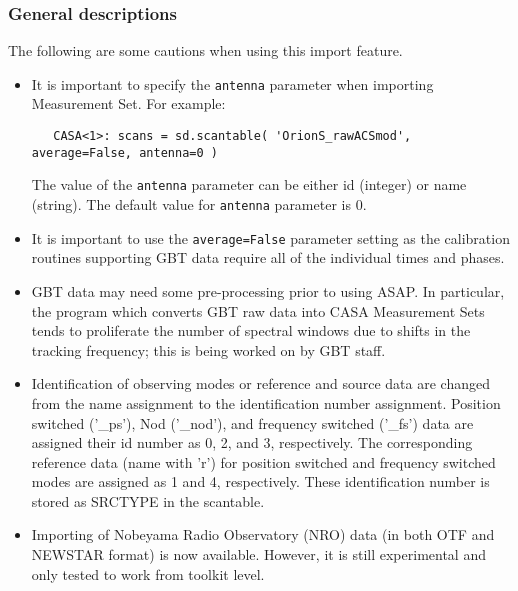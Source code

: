 \subsubsection{General descriptions}
\label{subsubsection:sd.asap.import.gen}

The following are some cautions when using this import feature.

\begin{itemize}

\item It is important to specify the {\tt antenna} parameter when importing Measurement Set.
 For example:

\begin{verbatim}
   CASA<1>: scans = sd.scantable( 'OrionS_rawACSmod', average=False, antenna=0 )
\end{verbatim}
 
 The value of the {\tt antenna} parameter can be either id (integer) or name
 (string). The default value for {\tt antenna} parameter is 0.

\item It is important to use the {\tt average=False} parameter
setting as the calibration routines supporting GBT data require all of
the individual times and phases.

\item GBT data may need some pre-processing prior to using
ASAP. In particular, the program which converts GBT raw data into CASA
Measurement Sets tends to proliferate the number of spectral windows
due to shifts in the tracking frequency; this is being worked on by
GBT staff. 

%
\item  Identification of observing modes or reference and source data are
 changed from the name assignment to the identification number
 assignment. Position switched ('\_ps'), Nod ('\_nod'), and  frequency
 switched ('\_fs') data are assigned their id number as 0, 2, and 3,
 respectively. The corresponding reference data (name with 'r') for position
 switched and frequency switched modes are assigned as 1 and 4,
 respectively. These identification number is stored as SRCTYPE in
 the scantable.

\item  Importing of Nobeyama Radio Observatory (NRO) data (in both OTF and NEWSTAR format)
 is now available. However, it is still experimental and only tested to work from toolkit level.
\end{itemize}

